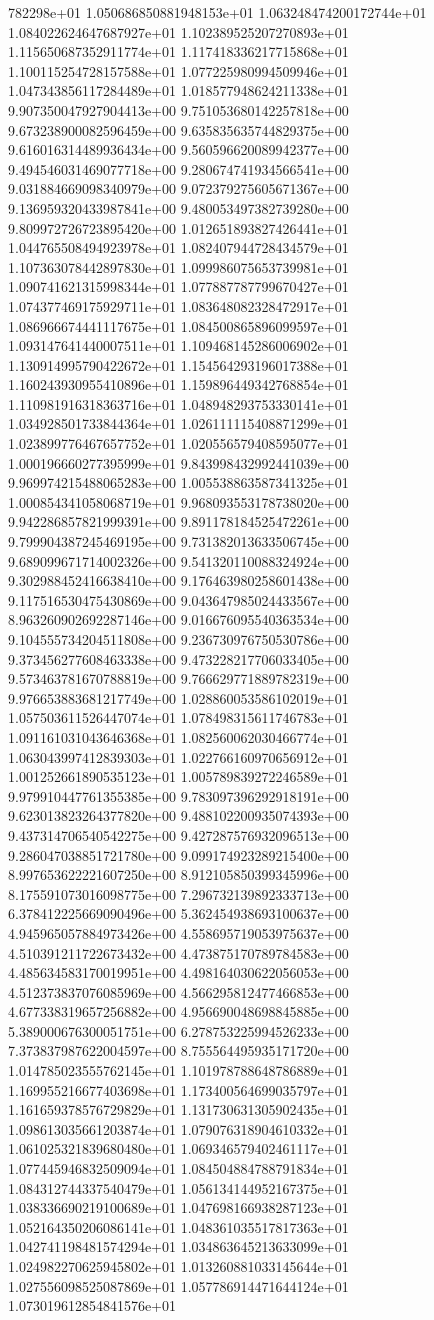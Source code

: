 782298e+01	1.050686850881948153e+01	1.063248474200172744e+01	1.084022624647687927e+01	1.102389525207270893e+01	1.115650687352911774e+01	1.117418336217715868e+01	1.100115254728157588e+01	1.077225980994509946e+01	1.047343856117284489e+01	1.018577948624211338e+01	9.907350047927904413e+00	9.751053680142257818e+00	9.673238900082596459e+00	9.635835635744829375e+00	9.616016314489936434e+00	9.560596620089942377e+00	9.494546031469077718e+00	9.280674741934566541e+00	9.031884669098340979e+00	9.072379275605671367e+00	9.136959320433987841e+00	9.480053497382739280e+00	9.809972726723895420e+00	1.012651893827426441e+01	1.044765508494923978e+01	1.082407944728434579e+01	1.107363078442897830e+01	1.099986075653739981e+01	1.090741621315998344e+01	1.077887787799670427e+01	1.074377469175929711e+01	1.083648082328472917e+01	1.086966674441117675e+01	1.084500865896099597e+01	1.093147641440007511e+01	1.109468145286006902e+01	1.130914995790422672e+01	1.154564293196017388e+01	1.160243930955410896e+01	1.159896449342768854e+01	1.110981916318363716e+01	1.048948293753330141e+01	1.034928501733844364e+01	1.026111115408871299e+01	1.023899776467657752e+01	1.020556579408595077e+01	1.000196660277395999e+01	9.843998432992441039e+00	9.969974215488065283e+00	1.005538863587341325e+01	1.000854341058068719e+01	9.968093553178738020e+00	9.942286857821999391e+00	9.891178184525472261e+00	9.799904387245469195e+00	9.731382013633506745e+00	9.689099671714002326e+00	9.541320110088324924e+00	9.302988452416638410e+00	9.176463980258601438e+00	9.117516530475430869e+00	9.043647985024433567e+00	8.963260902692287146e+00	9.016676095540363534e+00	9.104555734204511808e+00	9.236730976750530786e+00	9.373456277608463338e+00	9.473228217706033405e+00	9.573463781670788819e+00	9.766629771889782319e+00	9.976653883681217749e+00	1.028860053586102019e+01	1.057503611526447074e+01	1.078498315611746783e+01	1.091161031043646368e+01	1.082560062030466774e+01	1.063043997412839303e+01	1.022766160970656912e+01	1.001252661890535123e+01	1.005789839272246589e+01	9.979910447761355385e+00	9.783097396292918191e+00	9.623013823264377820e+00	9.488102200935074393e+00	9.437314706540542275e+00	9.427287576932096513e+00	9.286047038851721780e+00	9.099174923289215400e+00	8.997653622221607250e+00	8.912105850399345996e+00	8.175591073016098775e+00	7.296732139892333713e+00	6.378412225669090496e+00	5.362454938693100637e+00	4.945965057884973426e+00	4.558695719053975637e+00	4.510391211722673432e+00	4.473875170789784583e+00	4.485634583170019951e+00	4.498164030622056053e+00	4.512373837076085969e+00	4.566295812477466853e+00	4.677338319657256882e+00	4.956690048698845885e+00	5.389000676300051751e+00	6.278753225994526233e+00	7.373837987622004597e+00	8.755564495935171720e+00	1.014785023555762145e+01	1.101978788648786889e+01	1.169955216677403698e+01	1.173400564699035797e+01	1.161659378576729829e+01	1.131730631305902435e+01	1.098613035661203874e+01	1.079076318904610332e+01	1.061025321839680480e+01	1.069346579402461117e+01	1.077445946832509094e+01	1.084504884788791834e+01	1.084312744337540479e+01	1.056134144952167375e+01	1.038336690219100689e+01	1.047698166938287123e+01	1.052164350206086141e+01	1.048361035517817363e+01	1.042741198481574294e+01	1.034863645213633099e+01	1.024982270625945802e+01	1.013260881033145644e+01	1.027556098525087869e+01	1.057786914471644124e+01	1.073019612854841576e+01	